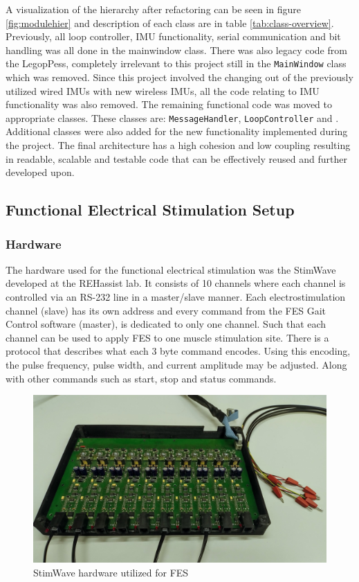A visualization of the hierarchy after refactoring can be seen in figure \ref{fig:modulehier} and description of each class are in table \ref{tab:class-overview}. Previously, all loop controller, IMU functionality, serial communication and bit handling was all done in the mainwindow class. There was also legacy code from the LegopPess, completely irrelevant to this project still in the \texttt{MainWindow} class which was removed. Since this project involved the changing out of the previously utilized wired IMUs with new wireless IMUs, all the code relating to IMU functionality was also removed. The remaining functional code was moved to appropriate classes. These classes are: \texttt{MessageHandler}, \texttt{LoopController} and . Additional classes were also added for the new functionality implemented during the project. The final architecture has a high cohesion and low coupling resulting in readable, scalable and testable code that can be effectively reused and further developed upon.




\subsection{Functional Electrical Stimulation Setup}

\subsubsection{Hardware}
The hardware used for the functional electrical stimulation was the StimWave developed at the REHassist lab. It consists of 10 channels where each channel is controlled via an RS-232 line in a master/slave manner. Each electrostimulation channel (slave) has its own address and every command from the FES Gait Control software (master), is dedicated to only one channel. Such that each channel can be used to apply FES to one muscle stimulation site. There is a protocol that describes what each 3 byte command encodes. Using this encoding, the pulse frequency, pulse width, and current amplitude may be adjusted. Along with other commands such as start, stop and status commands. 

\begin{figure} [h]
    \centering
    \includegraphics[width=0.8\linewidth]{images/stimwave.jpg}
    \caption{StimWave hardware utilized for FES}
    \label{fig:stimwave}
\end{figure}

